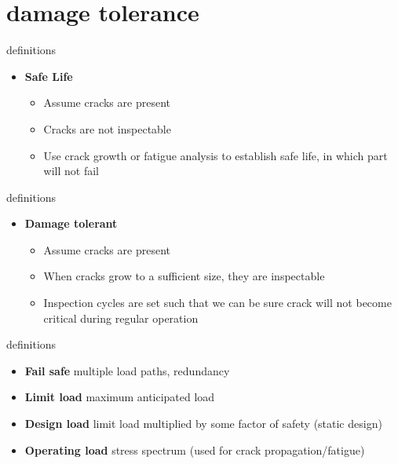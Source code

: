 \documentclass[
  letterpaper,
  ignorenonframetext,
  aspectratio=43,
  handout,
  12pt]{beamer}
\providecommand{\tightlist}{%
  \setlength{\itemsep}{0pt}\setlength{\parskip}{0pt}}
\providecommand{\tightlist}{%
\setlength{\itemsep}{0pt}\setlength{\parskip}{0pt}}
\begin{document}
\hypertarget{damage-tolerance}{%
\section{damage tolerance}\label{damage-tolerance}}

\begin{frame}{definitions}
\protect\hypertarget{definitions}{}
\begin{itemize}
\tightlist
\item
  \textbf{Safe Life}

  \begin{itemize}
  \tightlist
  \item
    Assume cracks are present
  \item
    Cracks are not inspectable
  \item
    Use crack growth or fatigue analysis to establish safe life, in
    which part will not fail
  \end{itemize}
\end{itemize}
\end{frame}

\begin{frame}{definitions}
\protect\hypertarget{definitions-1}{}
\begin{itemize}
\tightlist
\item
  \textbf{Damage tolerant}

  \begin{itemize}
  \tightlist
  \item
    Assume cracks are present
  \item
    When cracks grow to a sufficient size, they are inspectable
  \item
    Inspection cycles are set such that we can be sure crack will not
    become critical during regular operation
  \end{itemize}
\end{itemize}
\end{frame}

\begin{frame}{definitions}
\protect\hypertarget{definitions-2}{}
\begin{itemize}
\tightlist
\item
  \textbf{Fail safe} multiple load paths, redundancy
\item
  \textbf{Limit load} maximum anticipated load
\item
  \textbf{Design load} limit load multiplied by some factor of safety
  (static design)
\item
  \textbf{Operating load} stress spectrum (used for crack
  propagation/fatigue)
\end{itemize}
\end{frame}
\end{document}
